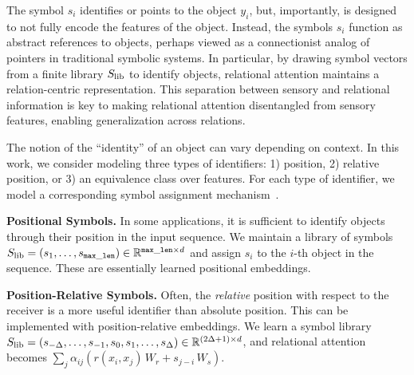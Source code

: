 The symbol $s_i$ identifies or points to the object $y_i$, but, importantly, is designed to not fully encode the features of the object.
Instead, the symbols $s_i$ function as abstract references to objects, perhaps viewed as a connectionist analog of pointers in traditional symbolic systems.
In particular, by drawing symbol vectors from a finite library $S_\mathrm{lib}$ to identify objects, relational attention maintains a relation-centric representation.
This separation between sensory and relational information is key to making relational attention disentangled from sensory features, enabling generalization across relations.

The notion of the ``identity'' of an object can vary depending on context. In this work, we consider modeling three types of identifiers: 1) position, 2) relative position, or 3) an equivalence class over features. For each type of identifier, we model a corresponding symbol assignment mechanism~\citep{altabaa2024abstractors}.

\textbf{Positional Symbols.} In some applications, it is sufficient to identify objects through their position in the input sequence. We maintain a library of symbols $S_\mathrm{lib} = (s_1, \ldots, s_{\mathtt{max\_len}}) \in \mathbb{R}^{\mathtt{max\_len} \times d}$ and assign $s_i$ to the $i$-th object in the sequence. These are essentially learned positional embeddings.

\textbf{Position-Relative Symbols.} Often, the \textit{relative} position with respect to the receiver is a more useful identifier than absolute position. This can be implemented with position-relative embeddings. We learn a symbol library $S_\mathrm{lib} = (s_{-\Delta}, \ldots, s_{-1}, s_0, s_1, \ldots, s_{\Delta}) \in \mathbb{R}^{(2 \Delta + 1) \times d}$, and relational attention becomes $\sum_{j} \alpha_{ij}  (r(x_i, x_j) \, W_r + s_{j-i} \,  W_s)$.%

